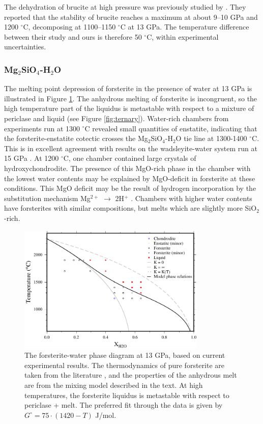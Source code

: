 \documentclass[review]{elsarticle}
\begin{document}
The dehydration of brucite at high pressure was previously studied by \cite{FIYKFO2005}. They reported that the stability of brucite reaches a maximum at about 9--10 GPa and 1200 $^{\circ}$C, decomposing at 1100--1150 $^{\circ}$C at 13 GPa. The temperature difference between their study and ours is therefore 50 $^{\circ}$C, within experimental uncertainties. 


\clearpage
\subsubsection{Mg$_2$SiO$_4$-H$_2$O}
The melting point depression of forsterite in the presence of water at 13 GPa is illustrated in Figure \ref{fig:foH}. The anhydrous melting of forsterite is incongruent, so the high temperature part of the liquidus is metastable with respect to a mixture of periclase and liquid (see Figure \ref{fig:ternary}). Water-rich chambers from experiments run at 1300 $^{\circ}$C revealed small quantities of enstatite, indicating that the forsterite-enstatite cotectic crosses the Mg$_2$SiO$_4$-H$_2$O tie line at 1300-1400 $^{\circ}$C. This is in excellent agreement with results on the wadsleyite-water system run at 15 GPa \citep{DDFK2005, LSOK2011}. At 1200 $^{\circ}$C, one chamber contained large crystals of hydroxychondrodite. The presence of this MgO-rich phase in the chamber with the lowest water contents may be explained by MgO-deficit in forsterite at these conditions. This MgO deficit may be the result of hydrogen incorporation by the substitution mechanism Mg$^{2+}$ $\rightarrow$ 2H$^+$ \citep{KB2006}. Chambers with higher water contents have forsterites with similar compositions, but melts which are slightly more SiO$_2$-rich.

\begin{figure}[ht!]
  \centering
      \includegraphics[width=0.8\textwidth]{figures/forsterite}
      \caption{The forsterite-water phase diagram at 13 GPa, based on current experimental results. The thermodynamics of pure forsterite are taken from the literature \citep{SLB2011}, and the properties of the anhydrous melt are from the mixing model described in the text. At high temperatures, the forsterite liquidus is metastable with respect to periclase + melt. The preferred fit through the data is given by $G^{\circ} = 75 \cdot (1420-T)$ J/mol.}
  \label{fig:foH}
\end{figure}
\clearpage
\end{document}
